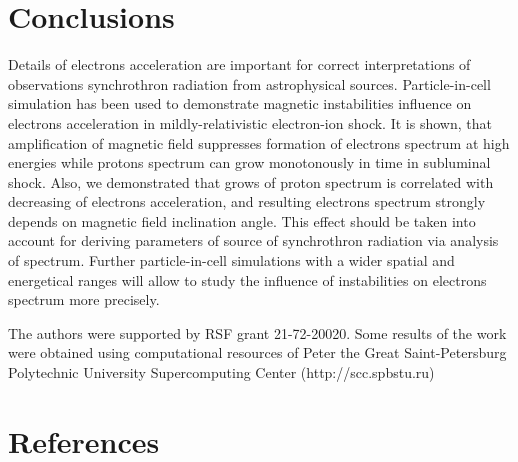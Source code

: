 \documentclass[a4paper]{jpconf}
\begin{document}
	
	\section{Conclusions}
	
	Details of electrons acceleration are important for correct interpretations of observations synchrothron radiation from astrophysical sources. Particle-in-cell simulation has been used to demonstrate magnetic instabilities influence on electrons acceleration in mildly-relativistic electron-ion shock. It is shown, that amplification of magnetic field suppresses formation of electrons spectrum at high energies while protons spectrum can grow monotonously in time in subluminal shock. Also, we demonstrated that grows of proton spectrum is correlated with decreasing of electrons acceleration, and resulting  electrons spectrum strongly depends on magnetic field inclination angle. This effect should be taken into account for deriving parameters of source of synchrothron radiation via analysis of spectrum. Further particle-in-cell simulations with a wider spatial and energetical ranges will allow to study the influence of instabilities on electrons spectrum more precisely.
	
	
	\ack
	The authors were supported by RSF grant 21-72-20020.
	Some results of the work were obtained using computational resources of Peter the Great Saint-Petersburg Polytechnic University Supercomputing Center (http://scc.spbstu.ru)
	
	\section*{References}
	

	
\end{document}

